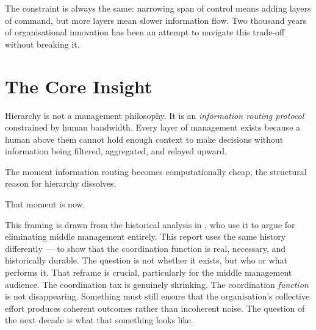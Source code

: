 The constraint is always the same: narrowing span of control means adding layers of command, but more layers mean slower information flow. Two thousand years of organisational innovation has been an attempt to navigate this trade-off without breaking it.

\section{The Core Insight}

\begin{keyinsight}[title={The Structural Argument}]
Hierarchy is not a management philosophy. It is an \emph{information routing protocol} constrained by human bandwidth. Every layer of management exists because a human above them cannot hold enough context to make decisions without information being filtered, aggregated, and relayed upward.

The moment information routing becomes computationally cheap, the structural reason for hierarchy dissolves.

That moment is now.
\end{keyinsight}

This framing is drawn from the historical analysis in \textcite{DorseyBotha2026}, who use it to argue for eliminating middle management entirely. This report uses the same history differently --- to show that the coordination function is real, necessary, and historically durable. The question is not whether it exists, but who or what performs it. That reframe is crucial, particularly for the middle management audience. The coordination tax is genuinely shrinking. The coordination \emph{function} is not disappearing. Something must still ensure that the organisation's collective effort produces coherent outcomes rather than incoherent noise. The question of the next decade is what that something looks like.
